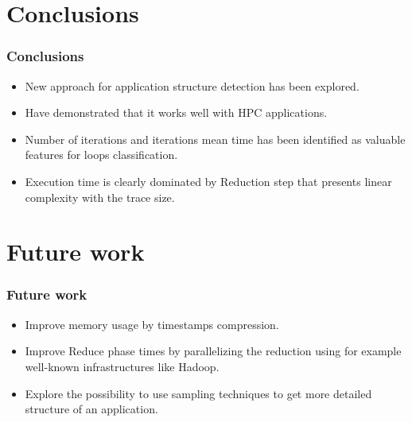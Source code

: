 \documentclass{beamer}
\begin{document}

\section{Conclusions}
\begin{frame}
\frametitle{Conclusions}
\begin{itemize}[<+->]
	\vfill\item New approach for application structure detection has been explored.
	\vfill\item Have demonstrated that it works well with HPC applications.
	\vfill\item Number of iterations and iterations mean time has been identified as valuable features for loops classification.
	\vfill\item Execution time is clearly dominated by Reduction step that presents linear complexity with the trace size.
\end{itemize}
\end{frame}

\section{Future work}
\begin{frame}
	\frametitle{Future work}
	\begin{itemize}[<+->]
		\vfill\item Improve memory usage by timestamps compression.
		\vfill\item Improve Reduce phase times by parallelizing the reduction using for example well-known infrastructures like Hadoop.
		\vfill\item Explore the possibility to use sampling techniques to get more detailed structure of an application.
		
	\end{itemize}
\end{frame}
\end{document}
